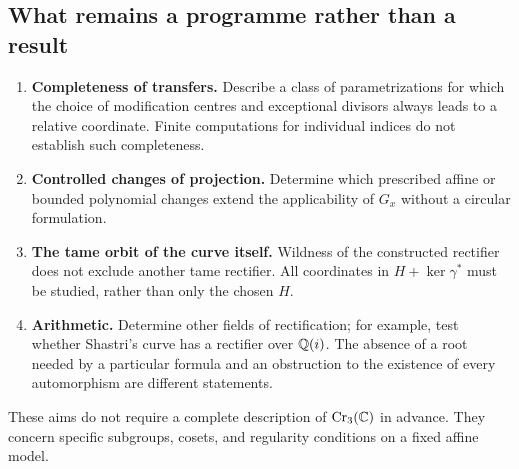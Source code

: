 \subsection{What remains a programme rather than a result}

\begin{enumerate}
\item \textbf{Completeness of transfers.} Describe a class of
parametrizations for which the choice of modification centres
and exceptional divisors always leads to a relative coordinate.
Finite computations for individual indices do not establish
such completeness.
\item \textbf{Controlled changes of projection.} Determine which
prescribed affine or bounded polynomial changes extend the
applicability of $G_x$ without a circular formulation.
\item \textbf{The tame orbit of the curve itself.} Wildness of
the constructed rectifier does not exclude another tame
rectifier. All coordinates in $H+\ker\gamma^*$ must be studied,
rather than only the chosen $H$.
\item \textbf{Arithmetic.} Determine other fields of rectification;
for example, test whether Shastri's curve has a rectifier over
${\mathbb Q}(i)$. The absence of a root needed by a particular formula
and an obstruction to the existence of every automorphism are
different statements.
\end{enumerate}
These aims do not require a complete description of $\operatorname{Cr}_3({\mathbb C})$
in advance. They concern specific subgroups, cosets, and regularity
conditions on a fixed affine model.
